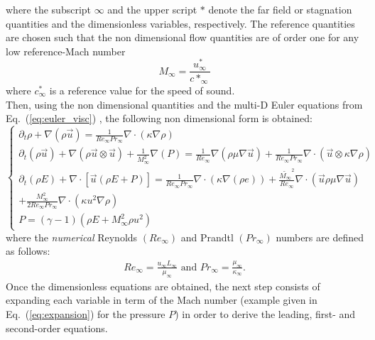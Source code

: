 \documentclass[preprint,10pt]{elsarticle}
\newcommand{\eqt}[1]{Eq.~(\ref{#1})}                     %
\begin{document}
where  the subscript $\infty$ and the upper script $*$ denote the far field or stagnation quantities and the dimensionless variables, respectively. The reference quantities are chosen such that the non dimensional flow quantities are of order one for any low reference-Mach number
\begin{equation}
M_{\infty} = \frac{u^*_{\infty}}{c*_{\infty}}
\end{equation}
where $c^*_{\infty}$ is a reference value for the speed of sound.\\
Then, using the non dimensional quantities and the multi-D Euler equations from \eqt{eq:euler_visc} , the following non dimensional form is obtained:
 \begin{equation}
\label{eq:Euler_eq2}
\left\{ 
\begin{array}{l}
\partial_t \rho+ \nabla \left(  \rho \vec{u}  \right) = \frac{1}{Re_{\infty} Pr_{\infty}} \nabla \cdot ( \kappa \nabla \rho )\\
\partial_t \left( \rho \vec{u} \right) + \nabla \left( \rho \vec{u}\otimes \vec{u} \right) + \frac{1}{M_{\infty}^2}\nabla \left( P \right) = \frac{1}{Re_{\infty}}\nabla \left( \rho \mu \nabla \vec{u} \right) + \frac{1}{Re_{\infty} Pr_{\infty}} \nabla \cdot (\vec{u}\otimes \kappa \nabla \rho )\\
\partial_t \left( \rho E \right) + \nabla \cdot \left[ \vec{u} \left( \rho E + P \right) \right] = \frac{1}{Re_{\infty} Pr_{\infty}} \nabla \cdot(\kappa \nabla(\rho e)) + \frac{\tilde{M_{\infty}}^2}{Re_{\infty}}\nabla \cdot \left( \vec{u} \rho \mu \nabla \vec{u} \right)  \\
+ \frac{M_{\infty}^2}{2 Re_{\infty} Pr_{\infty}} \nabla \cdot (\kappa u^2 \nabla \rho) \\
P = \left( \gamma-1 \right) \left( \rho E + M_{\infty}^2 \rho u^2 \right)
\end{array}
\right.
\end{equation}
where the \emph{numerical} Reynolds $(Re_{\infty})$ and Prandtl $(Pr_{\infty})$ numbers are defined as follows:
\begin{eqnarray}
\label{eq:ref_numb}
Re_{\infty} = \frac{u_{\infty} L_{\infty}}{\mu_{\infty}} \text{ and }
Pr_{\infty} = \frac{\mu_{\infty}}{\kappa_{\infty}} \text{.}
\end{eqnarray}
Once the dimensionless equations are obtained, the next step consists of expanding each variable in term of the Mach number (example given in \eqt{eq:expansion} for the pressure $P$) in order to derive the leading, first- and second-order equations. 
\end{document}
